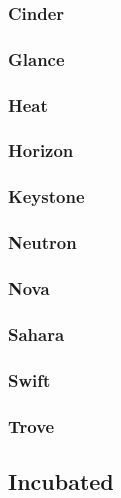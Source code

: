 \documentclass[a4wide,11pt]{report}
\begin{document}
\newpage 
\subsubsection{Cinder}


\newpage 
\subsubsection{Glance}


\newpage 
\subsubsection{Heat}


\newpage 
\subsubsection{Horizon}


\newpage 
\subsubsection{Keystone}


\newpage 
\subsubsection{Neutron}


\newpage 
\subsubsection{Nova}


\newpage 
\subsubsection{Sahara}


\newpage 
\subsubsection{Swift}


\newpage 
\subsubsection{Trove}


\newpage
\subsection{Incubated}

\end{document}
